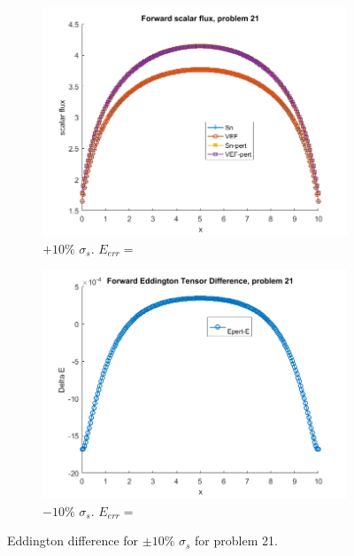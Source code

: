 \documentclass{article}
\begin{document}
\begin{figure}[H]
\centering
\begin{subfigure}{.5\textwidth}
  \centering
  \includegraphics[width=1\linewidth]{p21deltaEdss10.png}
  \caption{$+10\%$ $\sigma_s$. $E_{err}=$}
  \label{fig:sub1}
\end{subfigure}%
\begin{subfigure}{.5\textwidth}
  \centering
  \includegraphics[width=1\linewidth]{p21deltaEdss-10.png}
  \caption{$-10\%$ $\sigma_s$. $E_{err}=$}
  \label{fig:sub2}
\end{subfigure}
\caption{Eddington difference for $\pm10\%$ $\sigma_s$ for problem 21.}
\label{fig:test}
\end{figure}
\end{document}
